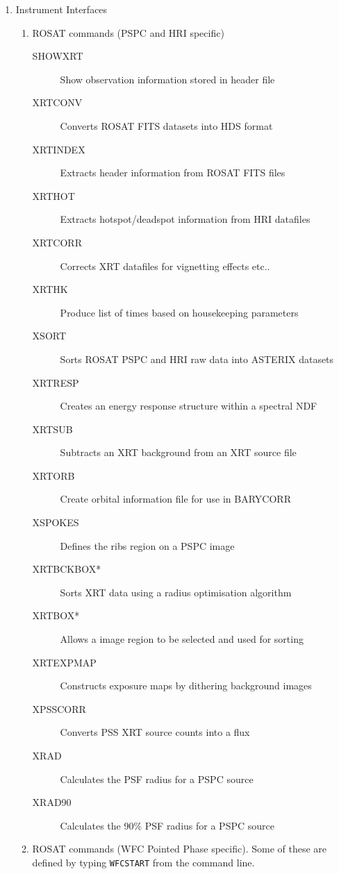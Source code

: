 \documentclass{book}
\renewcommand{\_}{{\tt\char'137}}     %
\begin{document}
 
\begin{enumerate}
\item Instrument Interfaces
 
\begin{enumerate}
\item ROSAT commands (PSPC and HRI specific)
 
\begin{description}
\item[SHOWXRT]
Show observation information stored in header file
\item[XRTCONV]
Converts ROSAT FITS datasets into HDS format
\item[XRTINDEX]
Extracts header information from ROSAT FITS files
\item[XRTHOT]
Extracts hotspot/deadspot information from HRI datafiles
\item[XRTCORR]
Corrects XRT datafiles for vignetting effects etc..
\item[XRTHK]
Produce list of times based on housekeeping parameters
\item[XSORT]
Sorts ROSAT PSPC and HRI raw data into ASTERIX datasets
\item[XRTRESP]
Creates an energy response structure within a spectral NDF
\item[XRTSUB]
Subtracts an XRT background from an XRT source file
\item[XRTORB]
Create orbital information file for use in BARYCORR
\item[XSPOKES]
Defines the ribs region on a PSPC image
\item[XRTBCKBOX*]
Sorts XRT data using a radius optimisation algorithm
\item[XRTBOX*]
Allows a image region to be selected and used for sorting
\item[XRTEXPMAP]
Constructs exposure maps by dithering background images
\item[XPSSCORR]
Converts PSS XRT source counts into a flux
\item[XRAD]
Calculates the PSF radius for a PSPC source
\item[XRAD90]
Calculates the 90\% PSF radius for a PSPC source
\end{description}
\item ROSAT commands (WFC Pointed Phase specific). Some of these are
defined by typing {\tt WFCSTART} from the command line.
 

\end{enumerate}
\end{enumerate}
\end{document}
